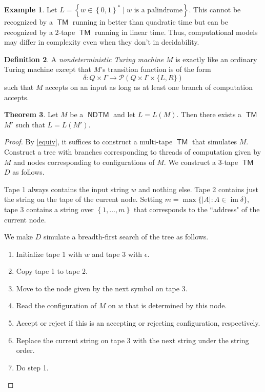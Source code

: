 \documentclass[10pt,letterpaper,cm]{nupset}
\theoremstyle{definition}
\newtheorem{definition}{Definition}[subsection]
\newtheorem{exmp}[definition]{Example}
\theoremstyle{theorem}
\newtheorem{theorem}[definition]{Theorem}
\theoremstyle{remark}
\renewcommand{\P}{\mathcal P}
\newcommand{\1}{\mathbf{1}}
\newcommand{\0}{\vec 0}
\DeclareMathOperator{\im}{im}
\DeclareMathOperator{\TM}{\mathsf{TM}}
\DeclareMathOperator{\NDTM}{\mathsf{NDTM}}
\begin{document}
\begin{exmp}
Let $L = \left\{w \in \left\{0,1\right\}^{\ast} \mid w \text{ is a palindrome}\right\}$. This cannot be recognized by a $\TM$ running in better than quadratic time  but can be recognized by a $2$-tape $\TM$ running in linear time.  Thus, computational models may differ in complexity even when they don't in decidability.
\end{exmp}

\begin{definition}
A \textit{nondeterministic Turing machine} $M$ is exactly like an ordinary Turing machine except that $M$'s transition function is of the form $$ \delta : Q \times \Gamma \to \P(Q \times \Gamma \times \{L, R\})  $$ such that $M$ accepts on an input as long as at least one branch of computation accepts.
\end{definition}

\begin{theorem}\label{LT}
Let $M$ be a $\NDTM$ and let $L = L(M)$. Then there exists a $\TM$ $M'$ such that $L= L(M')$. 
\end{theorem}
\begin{proof}
By \cref{equiv}, it suffices to construct a multi-tape $\TM$ that simulates $M$. Construct a tree with branches corresponding to threads of computation given by $M$ and nodes corresponding to configurations of $M$. We construct a $3$-tape $\TM$ $D$ as follows. 

\medskip

 Tape 1 always contains the input string $w$ and nothing else. Tape 2 contains just the string on the tape of the current node. Setting $m = \max\{ \left\lvert{A}\right\rvert : A \in \im{\delta} \}$, tape 3 contains a string over $\left\{1, \ldots, m\right\}$ that corresponds to the ``address" of the current node. 

\medskip

 We make $D$ simulate a breadth-first search of the tree as follows. 
\begin{enumerate}
\item Initialize  tape 1 with $w$ and tape $3$ with $\epsilon$. 
\item Copy tape 1 to tape 2.
\item Move to the node given by the next symbol on tape 3.
\item Read the configuration of $M$ on $w$ that is determined by this node.
\item Accept or reject if this is an accepting or rejecting configuration, respectively. 
\item Replace the current string on tape 3 with the next string under the string order.
\item Do step 1.
\end{enumerate}
\end{proof}
\end{document}
